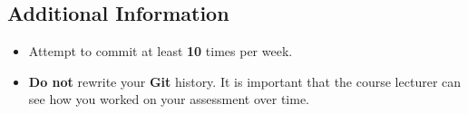 \documentclass{article}
\begin{document}
\subsection*{Additional Information}
\begin{itemize}
	\item Attempt to commit at least \textbf{10} times per week.
	\item \textbf{Do not} rewrite your \textbf{Git} history. It is important that the course lecturer can see how you worked on your assessment over time.
\end{itemize}
\end{document}
